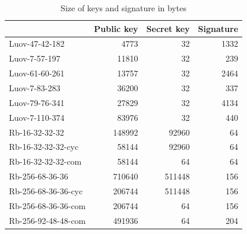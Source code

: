 \documentclass[thesis=M,english]{FITthesis}[2019/12/23]
\begin{document}
\begin{table}[]
\centering
\begin{tabular}{|l|r|r|r|}
\hline
                    & \multicolumn{1}{l|}{{ Public key}} & \multicolumn{1}{l|}{{ Secret key}} & \multicolumn{1}{l|}{{ Signature}} \\ \hline
 Luov-47-42-182      &  4773                            &  32                              &  1332                           \\ \hline
 Luov-7-57-197       &  11810                           &  32                              &  239                            \\ \hline
 Luov-61-60-261      &  13757                           &  32                              &  2464                           \\ \hline
 Luov-7-83-283       &  36200                           &  32                              &  337                            \\ \hline
 Luov-79-76-341      &  27829                           &  32                              &  4134                           \\ \hline
 Luov-7-110-374      &  83976                           &  32                              &  440                            \\ \hline
 Rb-16-32-32-32      &  148992                          &  92960                           &  64                             \\ \hline
 Rb-16-32-32-32-cyc  &  58144                           &  92960                           &  64                             \\ \hline
 Rb-16-32-32-32-com  &  58144                           &  64                              &  64                             \\ \hline
 Rb-256-68-36-36     &  710640                          &  511448                          &  156                            \\ \hline
 Rb-256-68-36-36-cyc &  206744                          &  511448                          &  156                            \\ \hline
 Rb-256-68-36-36-com &  206744                          &  64                              &  156                            \\ \hline
 Rb-256-92-48-48-com &  491936                          &  64                              &  204                            \\ \hline
\end{tabular}
\caption{Size of keys and signature in bytes}
\end{table}
\end{document}
